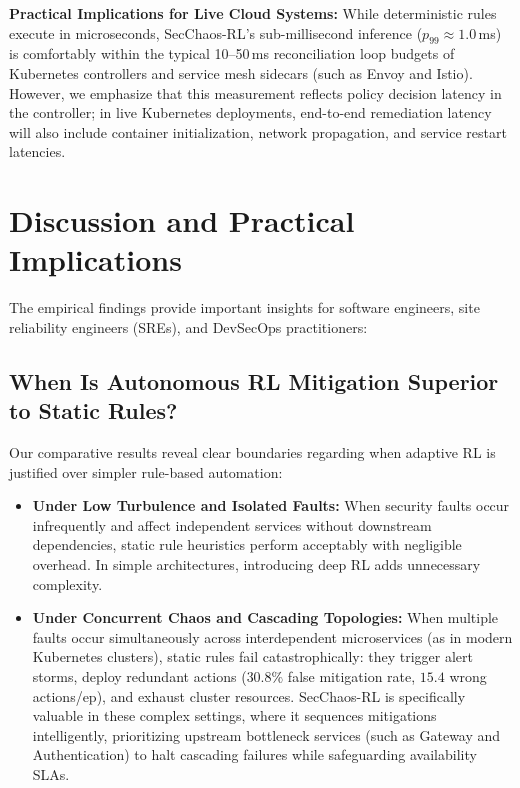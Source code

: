 \documentclass[ASNA,twocolumn]{USG}
\begin{document}
\textbf{Practical Implications for Live Cloud Systems:} While deterministic rules execute in microseconds, SecChaos-RL's sub-millisecond inference ($p_{99} \approx 1.0$\,ms) is comfortably within the typical 10--50\,ms reconciliation loop budgets of Kubernetes controllers and service mesh sidecars (such as Envoy and Istio). However, we emphasize that this measurement reflects policy decision latency in the controller; in live Kubernetes deployments, end-to-end remediation latency will also include container initialization, network propagation, and service restart latencies.

\section{Discussion and Practical Implications}
\label{sec:discussion}

The empirical findings provide important insights for software engineers, site reliability engineers (SREs), and DevSecOps practitioners:

\subsection{When Is Autonomous RL Mitigation Superior to Static Rules?}
Our comparative results reveal clear boundaries regarding when adaptive RL is justified over simpler rule-based automation:
\begin{itemize}
    \item \textbf{Under Low Turbulence and Isolated Faults:} When security faults occur infrequently and affect independent services without downstream dependencies, static rule heuristics perform acceptably with negligible overhead. In simple architectures, introducing deep RL adds unnecessary complexity.
    \item \textbf{Under Concurrent Chaos and Cascading Topologies:} When multiple faults occur simultaneously across interdependent microservices (as in modern Kubernetes clusters), static rules fail catastrophically: they trigger alert storms, deploy redundant actions ($30.8\%$ false mitigation rate, $15.4$ wrong actions/ep), and exhaust cluster resources. SecChaos-RL is specifically valuable in these complex settings, where it sequences mitigations intelligently, prioritizing upstream bottleneck services (such as Gateway and Authentication) to halt cascading failures while safeguarding availability SLAs.
\end{itemize}
\end{document}
